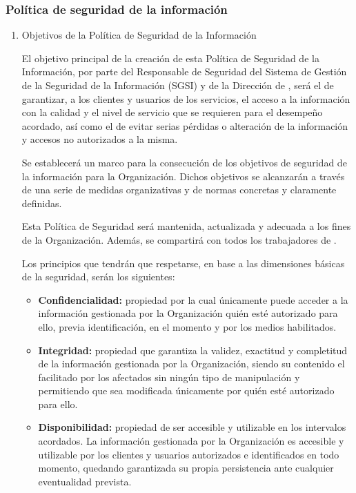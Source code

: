 
\subsubsection{Política de seguridad de la información}

\begin{enumerate}[label=\alph*)]
\item Objetivos de la Política de Seguridad de la Información

El objetivo principal de la creación de esta Política de Seguridad de la Información, por parte del Responsable de Seguridad del Sistema de Gestión de la Seguridad de la Información (SGSI) y de la Dirección de \textbf{\Beneficiario}, será el de garantizar, a los clientes y usuarios de los servicios, el acceso a la información con la calidad y el nivel de servicio que se requieren para el desempeño acordado, así como el de evitar serias pérdidas o alteración de la información y accesos no autorizados a la misma.

Se establecerá un marco para la consecución de los objetivos de seguridad de la información para la Organización. Dichos objetivos se alcanzarán a través de una serie de medidas organizativas y de normas concretas y claramente definidas.

Esta Política de Seguridad será mantenida, actualizada y adecuada a los fines de la Organización. Además, se compartirá con todos los trabajadores de \textbf{\Beneficiario}.

Los principios que tendrán que respetarse, en base a las dimensiones básicas de la seguridad, serán los siguientes:

\begin{itemize}
  \item \textbf{Confidencialidad:} propiedad por la cual únicamente puede acceder a la información gestionada por la Organización quién esté autorizado para ello, previa identificación, en el momento y por los medios habilitados.

  \item \textbf{Integridad:} propiedad que garantiza la validez, exactitud y completitud de la información gestionada por la Organización, siendo su contenido el facilitado por los afectados sin ningún tipo de manipulación y permitiendo que sea modificada únicamente por quién esté autorizado para ello.

  \item \textbf{Disponibilidad:} propiedad de ser accesible y utilizable en los intervalos acordados. La información gestionada por la Organización es accesible y utilizable por los clientes y usuarios autorizados e identificados en todo momento, quedando garantizada su propia persistencia ante cualquier eventualidad prevista.
\end{itemize}


\end{enumerate}
